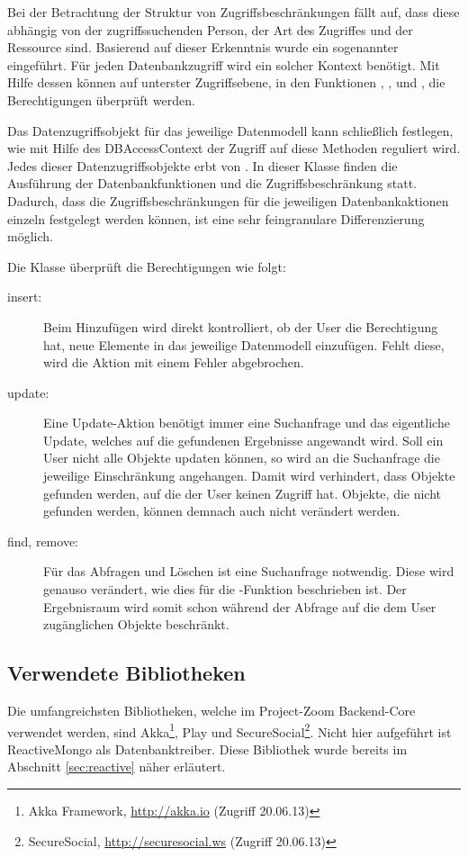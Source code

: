 Bei der Betrachtung der Struktur von Zugriffsbeschränkungen fällt auf, dass diese abhängig von der zugriffssuchenden Person, der Art des Zugriffes und der Ressource sind. Basierend auf dieser Erkenntnis wurde ein sogenannter  eingeführt. Für jeden Datenbankzugriff wird ein solcher Kontext benötigt. Mit Hilfe dessen können auf unterster Zugriffsebene, in den Funktionen , ,  und , die Berechtigungen überprüft werden.

Das Datenzugriffsobjekt für das jeweilige Datenmodell kann schließlich festlegen, wie mit Hilfe des DBAccessContext der Zugriff auf diese Methoden reguliert wird. Jedes dieser Datenzugriffsobjekte erbt von . In dieser Klasse finden die Ausführung der Datenbankfunktionen und die Zugriffsbeschränkung statt. Dadurch, dass die Zugriffsbeschränkungen für die jeweiligen Datenbankaktionen einzeln festgelegt werden können, ist eine sehr feingranulare Differenzierung möglich.

Die Klasse  überprüft die Berechtigungen wie folgt:
\begin{description}
\item[insert:] Beim Hinzufügen wird direkt kontrolliert, ob der User die Berechtigung hat, neue Elemente in das jeweilige Datenmodell einzufügen. Fehlt diese, wird die Aktion mit einem Fehler abgebrochen.
\item[update:] Eine Update-Aktion benötigt immer eine Suchanfrage und das eigentliche Update, welches auf die gefundenen Ergebnisse angewandt wird. Soll ein User nicht alle Objekte updaten können, so wird an die Suchanfrage die jeweilige Einschränkung angehangen. Damit wird verhindert, dass Objekte gefunden werden, auf die der User keinen Zugriff hat. Objekte, die nicht gefunden werden, können demnach auch nicht verändert werden.
\item[find, remove:] Für das Abfragen und Löschen ist eine Suchanfrage notwendig. Diese wird genauso verändert, wie dies für die -Funktion beschrieben ist. Der Ergebnisraum wird somit schon während der Abfrage auf die dem User zugänglichen Objekte beschränkt.
\end{description}

\subsection{Verwendete Bibliotheken}
Die umfangreichsten Bibliotheken, welche im Project-Zoom Backend-Core verwendet werden, sind Akka\footnote{Akka Framework, \url{http://akka.io} (Zugriff 20.06.13)}, Play und SecureSocial\footnote{SecureSocial, \url{http://securesocial.ws} (Zugriff 20.06.13)}. Nicht hier aufgeführt ist ReactiveMongo als Datenbanktreiber. Diese Bibliothek wurde bereits im Abschnitt \ref{sec:reactive} näher erläutert. 

